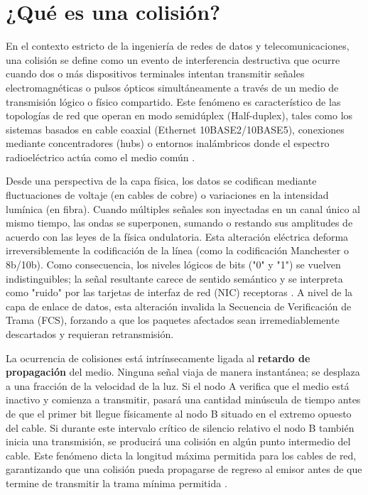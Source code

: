 \documentclass[a4paper,12pt]{article}
\begin{document}
\newpage

\section{¿Qué es una colisión?}

En el contexto estricto de la ingeniería de redes de datos y telecomunicaciones, una colisión se define como un evento de interferencia destructiva que ocurre cuando dos o más dispositivos terminales intentan transmitir señales electromagnéticas o pulsos ópticos simultáneamente a través de un medio de transmisión lógico o físico compartido. Este fenómeno es característico de las topologías de red que operan en modo semidúplex (Half-duplex), tales como los sistemas basados en cable coaxial (Ethernet 10BASE2/10BASE5), conexiones mediante concentradores (hubs) o entornos inalámbricos donde el espectro radioeléctrico actúa como el medio común \cite{tanenbaum2021}.

Desde una perspectiva de la capa física, los datos se codifican mediante fluctuaciones de voltaje (en cables de cobre) o variaciones en la intensidad lumínica (en fibra). Cuando múltiples señales son inyectadas en un canal único al mismo tiempo, las ondas se superponen, sumando o restando sus amplitudes de acuerdo con las leyes de la física ondulatoria. Esta alteración eléctrica deforma irreversiblemente la codificación de la línea (como la codificación Manchester o 8b/10b). Como consecuencia, los niveles lógicos de bits ("0" y "1") se vuelven indistinguibles; la señal resultante carece de sentido semántico y se interpreta como "ruido" por las tarjetas de interfaz de red (NIC) receptoras \cite{stallings2014}. A nivel de la capa de enlace de datos, esta alteración invalida la Secuencia de Verificación de Trama (FCS), forzando a que los paquetes afectados sean irremediablemente descartados y requieran retransmisión.

La ocurrencia de colisiones está intrínsecamente ligada al \textbf{retardo de propagación} del medio. Ninguna señal viaja de manera instantánea; se desplaza a una fracción de la velocidad de la luz. Si el nodo A verifica que el medio está inactivo y comienza a transmitir, pasará una cantidad minúscula de tiempo antes de que el primer bit llegue físicamente al nodo B situado en el extremo opuesto del cable. Si durante este intervalo crítico de silencio relativo el nodo B también inicia una transmisión, se producirá una colisión en algún punto intermedio del cable. Este fenómeno dicta la longitud máxima permitida para los cables de red, garantizando que una colisión pueda propagarse de regreso al emisor antes de que termine de transmitir la trama mínima permitida \cite{kurose2017}.
\end{document}
